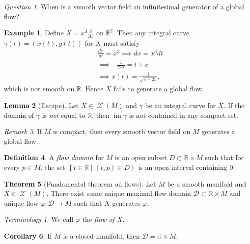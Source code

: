 \documentclass[10pt,letterpaper,cm]{nupset}
\theoremstyle{definition}
\newtheorem{definition}{Definition}[subsection]
\newtheorem{exmp}[definition]{Example}
\theoremstyle{theorem}
\newtheorem{theorem}[definition]{Theorem}
\newtheorem{lemma}[definition]{Lemma}
\newtheorem{corollary}[definition]{Corollary}
\theoremstyle{remark}
\newtheorem{remark}[definition]{Remark}
\newtheorem*{question}{Question}
\newtheorem*{term}{Terminology}
\newcommand{\R}{\mathbb R}
\newcommand{\1}{\mathbf{1}}
\newcommand{\0}{\vec 0}
\DeclareMathOperator{\im}{im}
\DeclareMathOperator{\vf}{\mathscr{X}}
\begin{document}
\begin{question}
When is a smooth vector field an infinitesimal generator of  a global flow?
\end{question}

\begin{exmp}
Define $X = x^3\frac{\partial}{\partial{x}}$ on $\R^2$. Then any integral curve $\gamma (t) = \left(x(t), y(t)\right)$ for $X$ must satisfy
\begin{align*}
& \frac{dx}{dt} = x^3
 \implies  dx = x^3dt
\\ & \implies {-\frac{1}{2x^2}} = t+c
\\ & \implies x(t) = \frac{1}{\sqrt{c-2t}},
\end{align*}
which is not smooth on $\R$. Hence $X$ fails to generate a global flow.
\end{exmp}

\begin{lemma}[Escape]
Let $X \in \vf(M)$ and $\gamma$ be an integral curve for $X$. If the domain of $\gamma$ is \emph{not} equal to $\R$, then $\im \gamma$ is not contained in any compact set.
\end{lemma}

\begin{remark}
If $M$ is compact, then every smooth vector field on $M$ generates a global flow.
\end{remark}

\begin{definition}
A \textit{flow domain} for $M$ is an open subset $D\subset \R \times M$ such that for every $p\in M$, the set $\left\{t\in \R \mid \left(t, p\right) \in D\right\}$ is an open interval containing $0$
\end{definition}

\begin{theorem}[Fundamental theorem on flows]
Let $M$ be a smooth manifold and $X\in \vf(M)$. There exist some unique maximal flow domain $\mathcal{D}\subset \R \times M$ and unique flow $\varphi: \mathcal{D}  \to M$ such that $X$ generates $\varphi$.
\end{theorem}

\begin{term}
We call $\varphi$ the \textit{flow of $X$}.
\end{term}

\begin{corollary}
If $M$ is a closed manifold, then $\mathcal{D} = \R \times M$.
\end{corollary}
\end{document}
